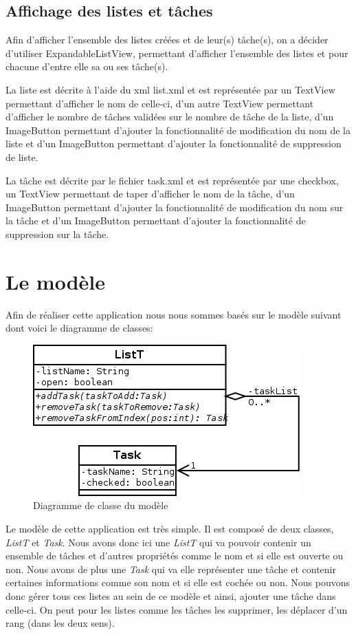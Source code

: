 \documentclass[a4paper,10pt]{article}
\begin{document}
\subsection{Affichage des listes et tâches}
Afin d'afficher l'ensemble des listes créées et de leur(s) tâche(s), on a décider d'utiliser ExpandableListView, permettant d'afficher l'ensemble des listes et pour chacune d'entre elle sa ou ses tâche(s).

La liste est décrite à l'aide du xml list.xml et est représentée par un TextView permettant d'afficher le nom de celle-ci, d'un autre TextView permettant d'afficher le nombre de tâches validées sur le nombre de tâche de la liste, d'un ImageButton permettant d'ajouter la fonctionnalité de modification du nom de la liste et d'un ImageButton permettant d'ajouter la fonctionnalité de suppression de liste.

La tâche est décrite par le fichier task.xml et est représentée par une checkbox, un TextView permettant de taper d'afficher le nom de la tâche, d'un ImageButton permettant d'ajouter la fonctionnalité de modification du nom sur la tâche et d'un ImageButton permettant d'ajouter la fonctionnalité de suppression sur la tâche.

\newpage
\section{Le modèle}
Afin de réaliser cette application nous nous sommes basés sur le modèle suivant dont voici le diagramme de classes:
\begin{figure}[htpb]
	\center
	\includegraphics[scale=0.5]{Images/dia_classe.png}
	\caption{Diagramme de classe du modèle}
\end{figure}

Le modèle de cette application est très simple. Il est composé de deux classes, \textit{ListT} et \textit{Task}.
Nous avons donc ici une \textit{ListT} qui va pouvoir contenir un ensemble de tâches et d'autres propriétés comme le nom et si elle est ouverte ou non. Nous avons de plus une \textit{Task} qui va elle représenter une tâche et contenir certaines informations comme son nom et si elle est cochée ou non.
Nous pouvons donc gérer tous ces listes au sein de ce modèle et ainsi, ajouter une tâche dans celle-ci. On peut pour les listes comme les tâches les supprimer, les déplacer d'un rang (dans les deux sens).
\end{document}
